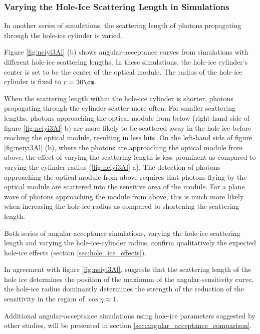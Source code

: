 \subsubsection{Varying the Hole-Ice Scattering Length in Simulations}
\label{sec:vary_sca}

In another series of simulations, the scattering length of photons propagating through the hole-ice cylinder is varied.


Figure \ref{fig:neiyi3Al} (b) shows angular-acceptance curves from simulations with different hole-ice scattering lengths. In these simulations, the hole-ice cylinder's center is set to be the center of the optical module. The radius of the hole-ice cylinder is fixed to $r = 30\cm$.

When the scattering length within the hole-ice cylinder is shorter, photons propagating through the cylinder scatter more often.
For smaller scattering lengths, photons approaching the optical module from below (right-hand side of figure \ref{fig:neiyi3Al} b) are more likely to be scattered away in the hole ice before reaching the optical module, resulting in less hits.
On the left-hand side of figure \ref{fig:neiyi3Al} (b), where the photons are approaching the optical module from above, the effect of varying the scattering length is less prominent as compared to varying the cylinder radius (\ref{fig:neiyi3Al} a). The detection of photons approaching the optical module from above requires that photons flying by the optical module are scattered into the sensitive area of the module. For a plane wave of photons approaching the module from above, this is much more likely when increasing the hole-ice radius as compared to shortening the scattering length.

Both series of angular-acceptance simulations, varying the hole-ice scattering length and varying the hole-ice-cylinder radius, confirm qualitatively the expected hole-ice effects (section \ref{sec:hole_ice_effects}).

In agreement with figure \ref{fig:neiyi3Al}, \rongen \cite{pocam} suggests
that the scattering length of the hole ice determines the position of the maximum of the angular-sensitivity curve, the hole-ice radius dominantly determines the strength of the reduction of the sensitivity in the region of $\cos \eta \approx 1$.

Additional angular-acceptance simulations using hole-ice parameters suggested by other studies, will be presented in section \ref{sec:angular_acceptance_comparison}.
